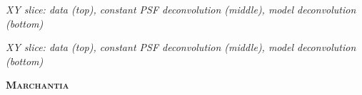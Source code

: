 \documentclass[a0paper,portrait,fontscale=0.35]{baposter}
\newcommand{\mycaption}[1]{
  {
    \smaller
    \emph{#1}
  }
}
\theoremstyle{plain}
\theoremstyle{plain}
\theoremstyle{definition}
\theoremstyle{plain}
\theoremstyle{definition}
\begin{document}
\begin{poster}
{\begin{minipage}[t]{0.51\textwidth}
\begin{minipage}[t]{0.49\textwidth}
      \vspace{-1em}
      \begin{center}
        \mycaption{
          XY slice: 
          data (top), constant PSF deconvolution (middle),
          model deconvolution (bottom)
        }
      \end{center}

      \vspace{-0.5em}
      \centering

      \vspace{-1em}
      \begin{center}
        \mycaption{
          XY slice:
          data (top), constant PSF deconvolution (middle),
          model deconvolution (bottom)
        }
      \end{center}
    \end{minipage}
  \end{minipage}
  \begin{minipage}[t]{0.48\textwidth}
    \begin{center}
      \larger
      \textbf{\textsc{Marchantia}}
    \end{center}

    \hspace{-2em}
    \begin{minipage}[t]{0.5\textwidth}


\end{minipage}
\end{minipage}}
\end{poster}
\end{document}
